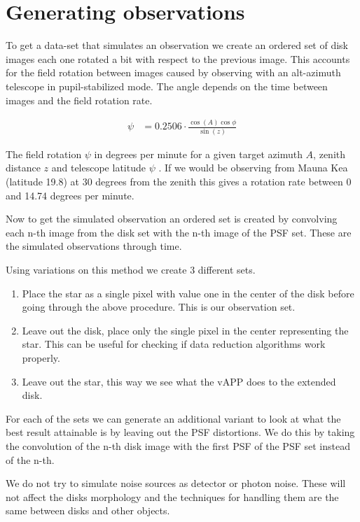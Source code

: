 





\section{Generating observations}
\label{sec:gen}
To get a data-set that simulates an observation we create an ordered set of disk images each one rotated a bit with respect to the previous image. This accounts for the field rotation between images caused by observing with an alt-azimuth telescope in pupil-stabilized mode. The angle depends on the time between images and the field rotation rate.

\begin{align}
  \psi &= 0.2506 \cdot \frac{\cos(A) \cos \phi}{\sin(z)} 
\end{align}

The field rotation $\psi$ in degrees per minute for a given target azimuth $A$, zenith distance $z$ and telescope latitude $\psi$ \cite[page 95]{Electronic_imaging}. If we would be observing from Mauna Kea (latitude 19.8) at 30 degrees from the zenith this gives a rotation rate between 0 and 14.74 degrees per minute.%

Now to get the simulated observation an ordered set is created by convolving each n-th image from the disk set with the n-th image of the  \ac{PSF}  set. These are the simulated observations through time. 

Using variations on this method we create 3 different sets.

\begin{enumerate}
\item Place the star as a single pixel with value one in the center of the disk before going through the above procedure. This is our observation set.
\item Leave out the disk, place only the single pixel in the center representing the star. This can be useful for checking if data reduction algorithms work properly.
\item Leave out the star, this way we see what the \ac{vAPP} does to the extended disk.
\end{enumerate}

For each of the sets we can generate an additional variant to look at what the best result attainable is by leaving out the  \ac{PSF}  distortions. We do this by taking the convolution of the n-th disk image with the first \ac{PSF} of the \ac{PSF} set instead of the n-th.

We do not try to simulate noise sources as detector or photon noise. These will not affect the disks morphology and the techniques for handling them are the same between disks and other objects.
